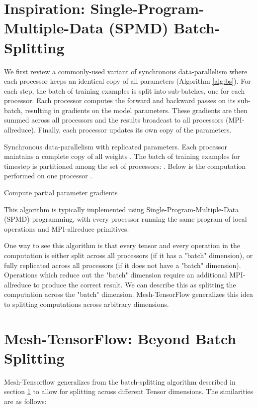 \documentclass{article}
\begin{document}
\section{Inspiration: Single-Program-Multiple-Data (SPMD) Batch-Splitting} \label{sec:bs}
We first review a commonly-used variant of synchronous data-parallelism where each processor keeps an identical copy of all parameters (Algorithm \ref{alg:bs}).  For each step, the batch of training examples is split into sub-batches, one for each processor.  Each processor computes the forward and backward passes on its sub-batch, resulting in gradients on the model parameters.  These gradients are then summed across all processors and the results broadcast to all processors (MPI-allreduce).  Finally, each processor updates its own copy of the parameters.

\begin{algorithm}[h!]
\caption{Synchronous data-parallelism with replicated parameters.  Each processor maintains a complete copy of all weights . The batch  of training examples for timestep  is partitioned among the set  of processors:  .   Below is the computation performed on one processor . }
\begin{algorithmic}[1]
\State Compute partial parameter gradients  
\State  \Comment{}
\State  {}
\end{algorithmic}
\label{alg:bs}
\end{algorithm}

This algorithm is typically implemented using Single-Program-Multiple-Data (SPMD) programming, with every processor running the same program of local operations and MPI-allreduce primitives.

One way to see this algorithm is that every tensor and every operation in the computation is either split across all processors (if it has a "batch" dimension), or fully replicated across all processors (if it does not have a "batch" dimension). Operations which reduce out the "batch" dimension require an additional MPI-allreduce to produce the correct result.  We can describe this as splitting the computation across the "batch" dimension.  Mesh-TensorFlow generalizes this idea to splitting computations across arbitrary dimensions.

\section{Mesh-TensorFlow: Beyond Batch Splitting}
Mesh-Tensorflow generalizes from the batch-splitting algorithm described in section \ref{sec:bs} to allow for splitting across different Tensor dimensions.  The similarities are as follows:
\end{document}
